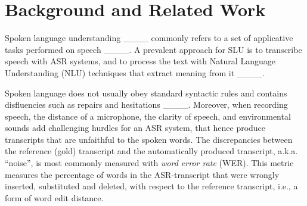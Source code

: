 \section{Background and Related Work}
\label{sec_related_work}

Spoken language understanding ____ commonly refers to a set of applicative tasks performed on speech ____. A prevalent approach for SLU is to transcribe speech with ASR systems, and to process the text with Natural Language Understanding (NLU) techniques that extract meaning from it ____.

Spoken language does not usually obey standard syntactic rules and contains disfluencies such as repairs and hesitations ____. Moreover, when recording speech, the distance of a microphone, the clarity of speech, and environmental sounds add challenging hurdles for an ASR system, that hence produce transcripts that are unfaithful to the spoken words. The discrepancies between the reference (gold) transcript and the automatically produced transcript, a.k.a. ``noise'', is most commonly measured with \textit{word error rate} (WER). This metric measures the percentage of words in the ASR-transcript that were wrongly inserted, substituted and deleted, with respect to the reference transcript, i.e., a form of word edit distance.

